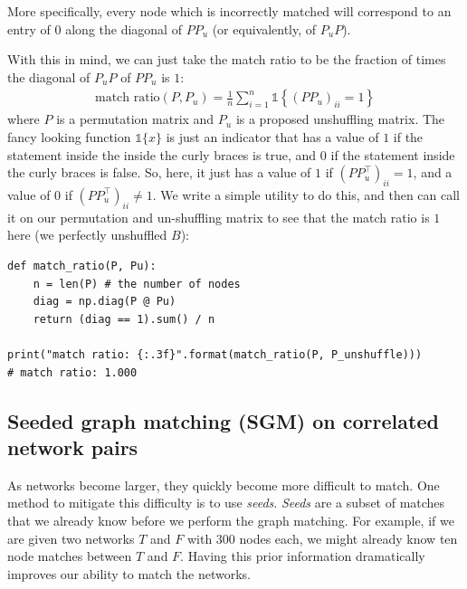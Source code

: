 More specifically, every node which is incorrectly matched will correspond to an entry of $0$ along the diagonal of $PP_u$ (or equivalently, of $P_u P$).

With this in mind, we can just take the match ratio to be the fraction of times the diagonal of $P_uP$ of $PP_u$ is $1$:
\begin{align*}
    \text{match ratio}(P, P_u) = \frac{1}{n} \sum_{i = 1}^n \mathds 1\left\{(PP_u)_{ii} = 1\right\}
\end{align*}
where $P$ is a permutation matrix and $P_u$ is a proposed unshuffling matrix. The fancy looking function $\mathds 1\{x\}$ is just an indicator that has a value of $1$ if the statement inside the inside the curly braces is true, and $0$ if the statement inside the curly braces is false. So, here, it just has a value of $1$ if $(PP_u^\top)_{ii} = 1$, and a value of $0$ if $(PP_u^\top)_{ii} \neq 1$. We write a simple utility to do this, and then can call it on our permutation and un-shuffling matrix to see that the match ratio is $1$ here (we perfectly unshuffled $B$):

\begin{lstlisting}[style=python]
def match_ratio(P, Pu):
    n = len(P) # the number of nodes
    diag = np.diag(P @ Pu)
    return (diag == 1).sum() / n

print("match ratio: {:.3f}".format(match_ratio(P, P_unshuffle)))
# match ratio: 1.000
\end{lstlisting}

\subsection{Seeded graph matching (SGM) on correlated network pairs}

As networks become larger, they quickly become more difficult to match. One method to mitigate this difficulty is to use \textit{seeds}. \textit{Seeds} are a subset of matches that we already know before we perform the graph matching. For example, if we are given two networks $T$ and $F$ with 300 nodes each, we might already know ten node matches between $T$ and $F$. Having this prior information dramatically improves our ability to match the networks. 

